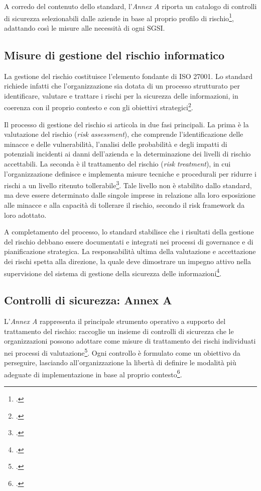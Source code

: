 A corredo del contenuto dello standard, l'\textit{Annex A} riporta un catalogo di controlli 
di sicurezza selezionabili dalle aziende in base al proprio profilo di rischio\footcite[Annex A]{iso27001},
adattando così le misure alle necessità di ogni SGSI.


\subsection{Misure di gestione del rischio informatico}
La gestione del rischio costituisce l’elemento fondante di ISO 27001. Lo standard richiede infatti che l’organizzazione 
sia dotata di un processo strutturato per identificare, valutare e trattare i rischi per la sicurezza delle informazioni, in coerenza 
con il proprio contesto e con gli obiettivi strategici\footcite[pp. 6--8]{iso27001}.

Il processo di gestione del rischio si articola in due fasi principali. La prima è la valutazione del rischio (\textit{risk assessment}), 
che comprende l’identificazione delle minacce e delle vulnerabilità, l’analisi delle probabilità e degli impatti di potenziali incidenti
ai danni dell'azienda e la determinazione dei livelli di rischio accettabili.
La seconda è il trattamento del rischio (\textit{risk treatment}), in cui l’organizzazione definisce e 
implementa misure tecniche e procedurali per ridurre i rischi a un livello ritenuto tollerabile\footcite[pp. 4--5]{iso27001}.
Tale livello non è stabilito dallo standard, ma deve essere determinato dalle singole imprese in relazione alla loro esposizione
alle minacce e alla capacità di tollerare il rischio, secondo il risk framework da loro adottato.

A completamento del processo, lo standard stabilisce che i risultati della gestione del rischio debbano essere documentati e 
integrati nei processi di governance e di pianificazione strategica. La responsabilità ultima della valutazione e accettazione dei 
rischi spetta alla direzione, la quale deve dimostrare un impegno attivo nella supervisione del sistema di gestione della sicurezza 
delle informazioni\footcite[pp. 5--6]{iso27001}.


\subsection{Controlli di sicurezza: Annex A}
L’\textit{Annex A} rappresenta il principale strumento operativo a supporto del trattamento del rischio:
raccoglie un insieme di controlli di sicurezza che le organizzazioni possono adottare come misure di trattamento dei 
rischi individuati nei processi di valutazione\footcite[pp. iv--v]{iso27001}.
Ogni controllo è formulato come un obiettivo da perseguire, lasciando all’organizzazione la libertà di definire 
le modalità più adeguate di implementazione in base al proprio contesto\footcite[p. 16]{watkins-iso}.

